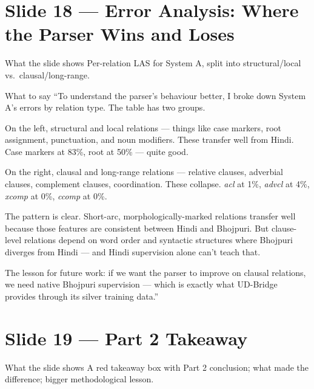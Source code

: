 \documentclass[11pt]{article}
\begin{document}
\section{Slide 18 --- Error Analysis: Where the Parser Wins and Loses}

\begin{pitchbox}{What the slide shows}
Per-relation LAS for System A, split into structural/local vs.\ clausal/long-range.
\end{pitchbox}

\begin{pitchbox}{What to say}
``To understand the parser's behaviour better, I broke down System A's errors by relation type. The table has two groups.

On the left, structural and local relations --- things like case markers, root assignment, punctuation, and noun modifiers. These transfer well from Hindi. Case markers at 83\%, root at 50\% --- quite good.

On the right, clausal and long-range relations --- relative clauses, adverbial clauses, complement clauses, coordination. These collapse. \textit{acl} at 1\%, \textit{advcl} at 4\%, \textit{xcomp} at 0\%, \textit{ccomp} at 0\%.

The pattern is clear. Short-arc, morphologically-marked relations transfer well because those features are consistent between Hindi and Bhojpuri. But clause-level relations depend on word order and syntactic structures where Bhojpuri diverges from Hindi --- and Hindi supervision alone can't teach that.

The lesson for future work: if we want the parser to improve on clausal relations, we need native Bhojpuri supervision --- which is exactly what UD-Bridge provides through its silver training data.''
\end{pitchbox}

\section{Slide 19 --- Part 2 Takeaway}

\begin{pitchbox}{What the slide shows}
A red takeaway box with Part 2 conclusion; what made the difference; bigger methodological lesson.
\end{pitchbox}
\end{document}
